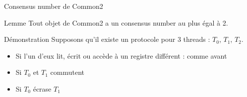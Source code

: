 
\begingroup

\begin{frame}[fragile]{Consensus number de Common2}
  \vspace{-2mm}
  \begin{block}{Lemme}
    Tout objet de Common2 a un consensus number au plus égal à 2.
  \end{block}
  \begin{block}{Démonstration}
    Supposons qu'il existe un protocole pour 3 threads : $T_0$, $T_1$, $T_2$.
    \begin{itemize}
    \item Si l'un d'eux lit, écrit ou accède à un registre différent : comme avant
    \end{itemize}
    \begin{minipage}{.45\textwidth}
      \begin{itemize}
      \item Si $T_0$ et $T_1$ commutent
      \end{itemize}
      \begin{center}
      \end{center}
    \end{minipage}
    \begin{minipage}{.5\textwidth}
      \begin{itemize}
      \item Si $T_0$ écrase $T_1$
      \end{itemize}
      \begin{center}
        \begin{tikzpicture}
          

\end{tikzpicture}
\end{center}
\end{minipage}
\end{block}
\end{frame}
